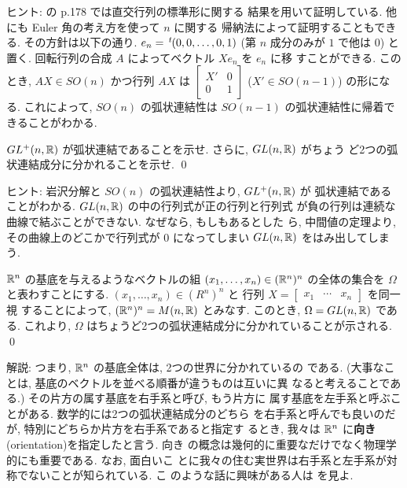 \documentclass[12pt,twoside]{jarticle}
\def\transposed#1{\,\vphantom{#1}^t\mskip-1.5mu{#1}} %
\begin{document}
\noindent ヒント: \cite{Satake} の p.178 では直交行列の標準形に関する
結果を用いて証明している. 他にも Euler 角の考え方を使って $n$ に関する
帰納法によって証明することもできる. その方針は以下の通り. %
$e_n = \transposed(0,0,\dots,0,1)$ (第 $n$ 成分のみが $1$ で他は $0$)
と置く. 回転行列の合成 $A$ によってベクトル $X e_n$ を $e_n$ に移
すことができる. このとき, $AX \in SO(n)$ かつ行列 $AX$ は %
\(\displaystyle \begin{bmatrix}X'&0\\0&1\end{bmatrix} \) %
($X' \in SO(n-1)$) の形になる. これによって, $SO(n)$ の弧状連結性は %
$SO(n-1)$ の弧状連結性に帰着できることがわかる.

\begin{question}
  $GL^+(n,{\mathbb R})$ が弧状連結であることを示せ. さらに, $GL(n,{\mathbb R})$ がちょう
  ど2つの弧状連結成分に分かれることを示せ. \qed
\end{question}

\noindent ヒント: 岩沢分解と $SO(n)$ の弧状連結性より, $GL^+(n,{\mathbb R})$ が
弧状連結であることがわかる. $GL(n,{\mathbb R})$ の中の行列式が正の行列と行列式
が負の行列は連続な曲線で結ぶことができない. なぜなら, もしもあるとした
ら, 中間値の定理より, その曲線上のどこかで行列式が 0 になってしまい 
$GL(n,{\mathbb R})$ をはみ出してしまう.

\begin{question}
  ${\mathbb R}^n$ の基底を与えるようなベクトルの組 $(x_1,\dots,x_n)\in ({\mathbb R}^n)^n$ %
  の全体の集合を $\Omega$ と表わすことにする. %
  $(x_1,\dots,x_n)\in (R^n)^n$ と%
  行列 $X = \begin{bmatrix} x_1 & \cdots & x_n \end{bmatrix}$ を同一視
  することによって, $({\mathbb R}^n)^n = M(n,{\mathbb R})$ とみなす. %
  このとき, $\Omega = GL(n,{\mathbb R})$ である. これより, 
  $\Omega$ はちょうど2つの弧状連結成分に分かれていることが示される. \qed
\end{question}

\noindent 解説: つまり, ${\mathbb R}^n$ の基底全体は, 2つの世界に分かれているの
である. (大事なことは, 基底のベクトルを並べる順番が違うものは互いに異
なると考えることである.) その片方の属す基底を右手系と呼び, もう片方に
属す基底を左手系と呼ぶことがある. 数学的には2つの弧状連結成分のどちら
を右手系と呼んでも良いのだが, 特別にどちらか片方を右手系であると指定す
るとき, 我々は ${\mathbb R}^n$ に{\bf 向き}(orientation)を指定したと言う. 向き
の概念は幾何的に重要なだけでなく物理学的にも重要である. なお, 面白いこ
とに我々の住む実世界は右手系と左手系が対称でないことが知られている. こ
のような話に興味がある人は \cite{Gardner} を見よ.
\end{document}
